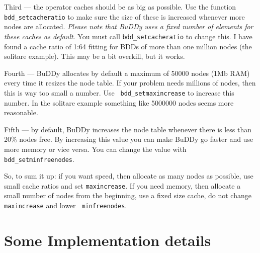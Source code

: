 \documentclass[a4paper,11pt,twoside,fleqn,openright]{report}
\begin{document}
Third --- the operator caches should be as big as possible. Use the
function {\tt bdd\_setcacheratio} to make sure the size of these is
increased whenever more nodes are allocated. {\em Please note that
  BuDDy uses a fixed number of elements for these caches as default}.
You must call {\tt bdd\_setcacheratio} to change this. I have found a
cache ratio of 1:64 fitting for BDDs of more than one million nodes
(the solitare example). This may be a bit overkill, but it works.

Fourth --- BuDDy allocates by default a maximum of 50000 nodes (1Mb
RAM) every time it resizes the node table. If your problem needs
millions of nodes, then this is way too small a number. Use {\tt
  bdd\_setmaxincrease} to increase this number. In the solitare
example something like 5000000 nodes seems more reasonable.

Fifth --- by default, BuDDy increases the node table whenever there is
less than 20\% nodes free. By increasing this value you can make BuDDy
go faster and use more memory or vice versa. You can change the value
with {\tt bdd\_setminfreenodes}.

So, to sum it up: if you want speed, then allocate as many nodes as
possible, use small cache ratios and set {\tt maxincrease}. If you
need memory, then allocate a small number of nodes from the beginning,
use a fixed size cache, do not change {\tt maxincrease} and lower {\tt
  minfreenodes}.


\chapter{Some Implementation details} 
\end{document}
